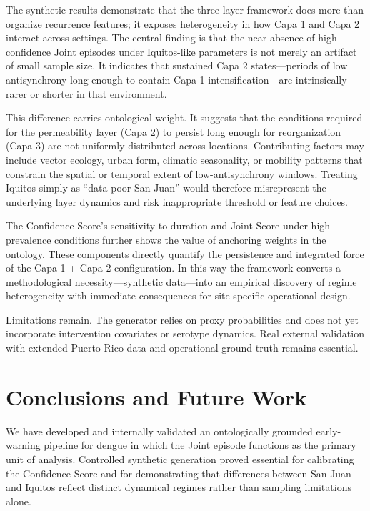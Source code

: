 \documentclass[11pt,a4paper]{article}
\begin{document}
The synthetic results demonstrate that the three-layer framework does more than organize recurrence features; it exposes heterogeneity in how Capa 1 and Capa 2 interact across settings. The central finding is that the near-absence of high-confidence Joint episodes under Iquitos-like parameters is not merely an artifact of small sample size. It indicates that sustained Capa 2 states—periods of low antisynchrony long enough to contain Capa 1 intensification—are intrinsically rarer or shorter in that environment.

This difference carries ontological weight. It suggests that the conditions required for the permeability layer (Capa 2) to persist long enough for reorganization (Capa 3) are not uniformly distributed across locations. Contributing factors may include vector ecology, urban form, climatic seasonality, or mobility patterns that constrain the spatial or temporal extent of low-antisynchrony windows. Treating Iquitos simply as “data-poor San Juan” would therefore misrepresent the underlying layer dynamics and risk inappropriate threshold or feature choices.

The Confidence Score’s sensitivity to duration and Joint Score under high-prevalence conditions further shows the value of anchoring weights in the ontology. These components directly quantify the persistence and integrated force of the Capa 1 + Capa 2 configuration. In this way the framework converts a methodological necessity—synthetic data—into an empirical discovery of regime heterogeneity with immediate consequences for site-specific operational design.

Limitations remain. The generator relies on proxy probabilities and does not yet incorporate intervention covariates or serotype dynamics. Real external validation with extended Puerto Rico data and operational ground truth remains essential.

\section{Conclusions and Future Work}

We have developed and internally validated an ontologically grounded early-warning pipeline for dengue in which the Joint episode functions as the primary unit of analysis. Controlled synthetic generation proved essential for calibrating the Confidence Score and for demonstrating that differences between San Juan and Iquitos reflect distinct dynamical regimes rather than sampling limitations alone.
\end{document}
